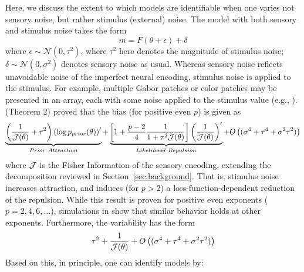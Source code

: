 \documentclass[si.tex]{subfiles}
\begin{document}
Here, we discuss the extent to which models are identifiable when one varies not sensory noise, but rather  stimulus (external) noise.
The model with both sensory and stimulus noise takes the form
\begin{equation}\label{eq:both-noise-types}
    m = F(\theta+\epsilon)+\delta
\end{equation}
where $\epsilon \sim \mathcal{N}(0,\tau^2)$, where $\tau^2$ here denotes the magnitude of stimulus noise; $\delta \sim \mathcal{N}(0, \sigma^2)$ denotes sensory noise as usual.
Whereas sensory noise reflects unavoidable noise of the imperfect neural encoding, stimulus noise is applied to the stimulus. For example, multiple Gabor patches or color patches may be presented in an array, each with some noise applied to the stimulus value (e.g., \cite{Tomassini2010OrientationUR, Girshick2011CardinalRV, Olkkonen2014TheCT}).
\citet{hahn2024unifying} (Theorem 2) proved that the bias (for positive even $p$) is given as
\begin{equation}\label{eq:stim-noise-bias}
        \underbrace{\left(\frac{1}{\FI(\theta)} + \tau^2\right)    \left( \log p_{prior}(\theta) \right)'}_{Prior\ Attraction}   + \underbrace{\left[ 1               + \frac{p-2}{4}     \frac{1}{1+\tau^2\FI(\theta)}    \right]   \left(\frac{1}{\FI(\theta)}\right)' }_{Likelihood\ Repulsion} + O\left((\sigma^4+\tau^4+\sigma^2\tau^2)\right)
        \end{equation}
        where $\mathcal{J}$ is the Fisher Information of the sensory encoding, extending the decomposition reviewed in Section~\ref{sec:background}.
        That is, stimulus noise increases attraction, and induces (for $p>2$) a loss-function-dependent reduction of the repulsion.
        While this result is proven for positive even exponents ($p=2,4,6,\dots$), simulations in \citet[][SI Appendix, Figure S5]{hahn2024unifying} show that similar behavior holds at other exponents.
        Furthermore,  the variability has the form
        \begin{equation}
            \tau^2 + \frac{1}{\mathcal{J}(\theta)}  + O\left((\sigma^4+\tau^4+\sigma^2\tau^2)\right)
        \end{equation}
Based on this, in principle, one can identify models by:
\end{document}

